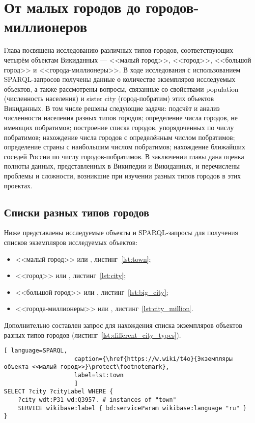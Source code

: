 \chapter{От малых городов до городов-миллионеров}
\label{ch:city}

Глава посвящена исследованию различных типов городов, соответствующих четырём объектам Викиданных — <<малый город>>, <<город>>, <<большой город>> и <<города-миллионеры>>. В ходе исследования с использованием SPARQL-запросов получены данные о количестве экземпляров исследуемых объектов, а также рассмотрены вопросы, связанные со свойствами population (численность населения) и sister city (город-побратим) этих объектов Викиданных. В том числе решены следующие задачи: подсчёт и анализ численности населения разных типов городов; определение числа городов, не имеющих побратимов; построение списка городов, упорядоченных по числу побратимов; нахождение числа городов с определённым числом побратимов; определение страны с наибольшим числом побратимов; нахождение ближайших соседей России по числу городов-побратимов. В заключении главы дана оценка полноты данных, представленных в Википедии и Викиданных, и перечислены проблемы и сложности, возникшие при изучении разных типов городов в этих проектах.
\section{Списки разных типов городов}

Ниже представлены исследуемые объекты и SPARQL-запросы для получения списков экземпляров исследуемых объектов: 
\begin{itemize}
	\item <<малый город>> или , листинг~\ref{lst:town};
	\item <<город>> или , листинг~\ref{lst:city};
	\item <<большой город>> или , листинг~\ref{lst:big_city};
	\item <<города-миллионеры>> или , листинг~\ref{lst:city_million}.
\end{itemize}

Дополнительно составлен запрос для нахождения списка экземпляров объектов разных типов городов (листинг~\ref{lst:different_city_types}).

\begin{lstlisting}[ language=SPARQL, 
                    caption={\href{https://w.wiki/t4o}{Экземпляры объекта <<малый город>>}\protect\footnotemark},
                    label=lst:town
                    ]
SELECT ?city ?cityLabel WHERE {
	?city wdt:P31 wd:Q3957. # instances of "town"
	SERVICE wikibase:label { bd:serviceParam wikibase:language "ru" }
}
\end{lstlisting}

